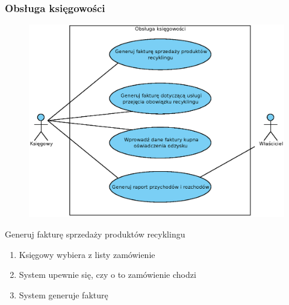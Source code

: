 \subsubsection{Obsługa księgowości}
	\begin{figure}[H]
		\centering
		\includegraphics[width=\textwidth]{img/UC/ksiegowosc.eps}
	\end{figure}

	\begin{usecase}{Generuj fakturę sprzedaży produktów recyklingu}
		\author{Arkadiusz Socha} 
		\maketitle
\begin{scenario}
 
			\begin{enumerate}
				\item Księgowy wybiera z listy zamówienie
				\item System upewnie się, czy o to zamówienie chodzi
				\item System generuje fakturę 
			\end{enumerate}
\end{scenario}
\end{usecase}

